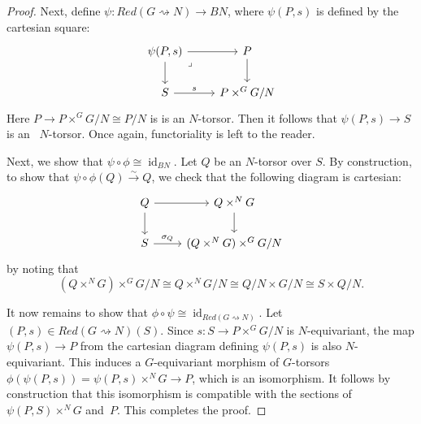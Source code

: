 \documentclass[12pt, final]{amsart}
\theoremstyle{remark}
\theoremstyle{definition}
\theoremstyle{plain}
\newcommand{\rsa}{\rightsquigarrow}
\DeclareMathOperator{\id}{id}
\begin{document}
\begin{proof}
    
    

    
    Next, define $\psi: Red(G \rsa N) \to BN$, 
    where $\psi(P,s)$ is defined by the cartesian square:
    $$
    \begin{tikzcd}
        \psi(P,s) & P \\
        S & {P\times^G G/N}
        \arrow[from=1-1, to=1-2]
        \arrow[from=1-1, to=2-1]
        \arrow["\lrcorner"{anchor=center, pos=0.125}, draw=none, from=1-1, to=2-2]
        \arrow[from=1-2, to=2-2]
        \arrow["s", from=2-1, to=2-2]
    \end{tikzcd}
    $$
    Here $P \to P \times^G G/N \cong P/N$ is  is an $N$-torsor. Then it follows that $\psi(P,s) \to S$ is an ~$N$-torsor. Once again, functoriality is left to the reader.

    

    Next, we show that $\psi\circ \phi \cong \id_{BN}$.
    Let $Q$ be an $N$-torsor over $S$. By construction, to show that 
    $\psi\circ\phi(Q) \xrightarrow{\sim} Q$,  we check that the following diagram is 
    cartesian:
    $$
    \begin{tikzcd}
        Q & {Q\times^NG} \\
        S & {(Q\times^N G)\times^G G/N}
        \arrow[from=1-1, to=1-2]
        \arrow[from=1-1, to=2-1]
        \arrow[from=1-2, to=2-2]
        \arrow["{\sigma_Q}", from=2-1, to=2-2]
    \end{tikzcd}
    $$ by noting that 
    $$
    (Q\times^N G)\times^G G/N \cong Q \times^N G/N \cong Q/N \times G/N \cong S \times Q/N.
    $$

    It now remains to show that
    $\phi\circ\psi \cong \id_{Red(G\rsa N)}$. Let $(P,s) \in Red(G\rsa N)(S)$.
    Since $s:S \to P \times^G G/N$ is $N$-equivariant, the map 
    $\psi(P,s) \to P$ from the cartesian diagram defining $\psi(P,s)$ is also 
    $N$-equivariant. This induces a $G$-equivariant morphism of $G$-torsors
    $\phi(\psi(P,s)) = \psi(P,s) \times^N G \to P$, which is an isomorphism. It follows by 
    construction that this isomorphism is compatible with the sections 
    of $\psi(P,S)\times^NG$ and~$P$. %
    This completes the proof.
\end{proof} 
\end{document}
